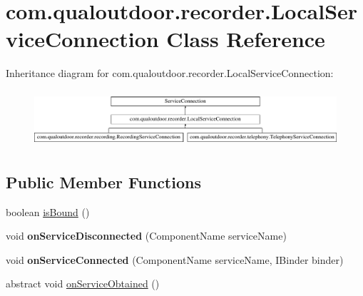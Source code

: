 \hypertarget{classcom_1_1qualoutdoor_1_1recorder_1_1LocalServiceConnection}{\section{com.\-qualoutdoor.\-recorder.\-Local\-Service\-Connection Class Reference}
\label{classcom_1_1qualoutdoor_1_1recorder_1_1LocalServiceConnection}
}
Inheritance diagram for com.\-qualoutdoor.\-recorder.\-Local\-Service\-Connection\-:\begin{figure}[H]
\begin{center}
\leavevmode
\includegraphics[height=2.115869cm]{classcom_1_1qualoutdoor_1_1recorder_1_1LocalServiceConnection}
\end{center}
\end{figure}
\subsection*{Public Member Functions}
\begin{DoxyCompactItemize}
\item 
boolean \hyperlink{classcom_1_1qualoutdoor_1_1recorder_1_1LocalServiceConnection_a1267eb452e2a476031e0b9e7ca4e2237}{is\-Bound} ()
\item 
\hypertarget{classcom_1_1qualoutdoor_1_1recorder_1_1LocalServiceConnection_ac9fe43df21f203386ff0a1b5ed6d70d8}{void {\bfseries on\-Service\-Disconnected} (Component\-Name service\-Name)}\label{classcom_1_1qualoutdoor_1_1recorder_1_1LocalServiceConnection_ac9fe43df21f203386ff0a1b5ed6d70d8}

\item 
\hypertarget{classcom_1_1qualoutdoor_1_1recorder_1_1LocalServiceConnection_aaf7e989ffaf6b728b887d5d11b245af8}{void {\bfseries on\-Service\-Connected} (Component\-Name service\-Name, I\-Binder binder)}\label{classcom_1_1qualoutdoor_1_1recorder_1_1LocalServiceConnection_aaf7e989ffaf6b728b887d5d11b245af8}

\item 
abstract void \hyperlink{classcom_1_1qualoutdoor_1_1recorder_1_1LocalServiceConnection_a54232b34d728f18d75c964438e3c5368}{on\-Service\-Obtained} ()
\end{DoxyCompactItemize}
